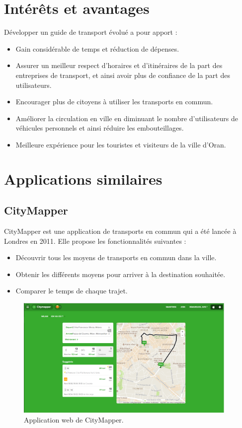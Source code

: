 \section{Intérêts et avantages}
Développer un guide de transport évolué a pour apport :
\begin{itemize}
	\item Gain considérable de temps et réduction de dépenses.
	\item Assurer un meilleur respect d'horaires et d'itinéraires de la part des entreprises de transport, et ainsi avoir plus de confiance de la part des utilisateurs.
	\item Encourager plus de citoyens à utiliser les transports en commun.
	\item Améliorer la circulation en ville en diminuant le nombre d'utilisateurs de véhicules personnels et ainsi réduire les embouteillages.
	\item Meilleure expérience pour les touristes et visiteurs de la ville d'Oran.
\end{itemize}

\section{Applications similaires}			
\subsection{CityMapper}
CityMapper est une application de transports en commun qui a été lancée à Londres en 2011.
Elle propose les fonctionnalités suivantes : 
\begin{itemize}
	\item Découvrir tous les moyens de transports en commun dans la ville.
	\item Obtenir les différents moyens pour arriver à la destination souhaitée.
	\item Comparer le temps de chaque trajet.
\end{itemize}

\begin{figure}[h!]
	\center
	\includegraphics[width=0.95\textwidth]{img/citymapper.png}
	\caption{Application web de CityMapper.}
	\label{fig:CityMapper}
\end{figure}

